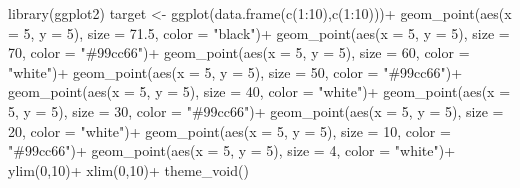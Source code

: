 \documentclass[
  letterpaper,
]{book}
\newenvironment{Shaded}{\begin{snugshade}}{\end{snugshade}}
\newcommand{\AttributeTok}[1]{\textcolor[rgb]{0.40,0.45,0.13}{#1}}
\newcommand{\DecValTok}[1]{\textcolor[rgb]{0.68,0.00,0.00}{#1}}
\newcommand{\FloatTok}[1]{\textcolor[rgb]{0.68,0.00,0.00}{#1}}
\newcommand{\FunctionTok}[1]{\textcolor[rgb]{0.28,0.35,0.67}{#1}}
\newcommand{\NormalTok}[1]{\textcolor[rgb]{0.00,0.23,0.31}{#1}}
\newcommand{\OtherTok}[1]{\textcolor[rgb]{0.00,0.23,0.31}{#1}}
\newcommand{\SpecialCharTok}[1]{\textcolor[rgb]{0.37,0.37,0.37}{#1}}
\newcommand{\StringTok}[1]{\textcolor[rgb]{0.13,0.47,0.30}{#1}}
\begin{document}
\begin{Shaded}
\begin{Highlighting}[]
\FunctionTok{library}\NormalTok{(ggplot2)}
\NormalTok{target }\OtherTok{\textless{}{-}} 
  \FunctionTok{ggplot}\NormalTok{(}\FunctionTok{data.frame}\NormalTok{(}\FunctionTok{c}\NormalTok{(}\DecValTok{1}\SpecialCharTok{:}\DecValTok{10}\NormalTok{),}\FunctionTok{c}\NormalTok{(}\DecValTok{1}\SpecialCharTok{:}\DecValTok{10}\NormalTok{)))}\SpecialCharTok{+}
  \FunctionTok{geom\_point}\NormalTok{(}\FunctionTok{aes}\NormalTok{(}\AttributeTok{x =} \DecValTok{5}\NormalTok{, }\AttributeTok{y =} \DecValTok{5}\NormalTok{), }\AttributeTok{size =} \FloatTok{71.5}\NormalTok{, }\AttributeTok{color =} \StringTok{"black"}\NormalTok{)}\SpecialCharTok{+}
  \FunctionTok{geom\_point}\NormalTok{(}\FunctionTok{aes}\NormalTok{(}\AttributeTok{x =} \DecValTok{5}\NormalTok{, }\AttributeTok{y =} \DecValTok{5}\NormalTok{), }\AttributeTok{size =} \DecValTok{70}\NormalTok{, }\AttributeTok{color =} \StringTok{"\#99cc66"}\NormalTok{)}\SpecialCharTok{+}
  \FunctionTok{geom\_point}\NormalTok{(}\FunctionTok{aes}\NormalTok{(}\AttributeTok{x =} \DecValTok{5}\NormalTok{, }\AttributeTok{y =} \DecValTok{5}\NormalTok{), }\AttributeTok{size =} \DecValTok{60}\NormalTok{, }\AttributeTok{color =} \StringTok{"white"}\NormalTok{)}\SpecialCharTok{+}
  \FunctionTok{geom\_point}\NormalTok{(}\FunctionTok{aes}\NormalTok{(}\AttributeTok{x =} \DecValTok{5}\NormalTok{, }\AttributeTok{y =} \DecValTok{5}\NormalTok{), }\AttributeTok{size =} \DecValTok{50}\NormalTok{, }\AttributeTok{color =} \StringTok{"\#99cc66"}\NormalTok{)}\SpecialCharTok{+}
  \FunctionTok{geom\_point}\NormalTok{(}\FunctionTok{aes}\NormalTok{(}\AttributeTok{x =} \DecValTok{5}\NormalTok{, }\AttributeTok{y =} \DecValTok{5}\NormalTok{), }\AttributeTok{size =} \DecValTok{40}\NormalTok{, }\AttributeTok{color =} \StringTok{"white"}\NormalTok{)}\SpecialCharTok{+}
  \FunctionTok{geom\_point}\NormalTok{(}\FunctionTok{aes}\NormalTok{(}\AttributeTok{x =} \DecValTok{5}\NormalTok{, }\AttributeTok{y =} \DecValTok{5}\NormalTok{), }\AttributeTok{size =} \DecValTok{30}\NormalTok{, }\AttributeTok{color =} \StringTok{"\#99cc66"}\NormalTok{)}\SpecialCharTok{+}
  \FunctionTok{geom\_point}\NormalTok{(}\FunctionTok{aes}\NormalTok{(}\AttributeTok{x =} \DecValTok{5}\NormalTok{, }\AttributeTok{y =} \DecValTok{5}\NormalTok{), }\AttributeTok{size =} \DecValTok{20}\NormalTok{, }\AttributeTok{color =} \StringTok{"white"}\NormalTok{)}\SpecialCharTok{+}
  \FunctionTok{geom\_point}\NormalTok{(}\FunctionTok{aes}\NormalTok{(}\AttributeTok{x =} \DecValTok{5}\NormalTok{, }\AttributeTok{y =} \DecValTok{5}\NormalTok{), }\AttributeTok{size =} \DecValTok{10}\NormalTok{, }\AttributeTok{color =} \StringTok{"\#99cc66"}\NormalTok{)}\SpecialCharTok{+}
  \FunctionTok{geom\_point}\NormalTok{(}\FunctionTok{aes}\NormalTok{(}\AttributeTok{x =} \DecValTok{5}\NormalTok{, }\AttributeTok{y =} \DecValTok{5}\NormalTok{), }\AttributeTok{size =} \DecValTok{4}\NormalTok{, }\AttributeTok{color =} \StringTok{"white"}\NormalTok{)}\SpecialCharTok{+}
  \FunctionTok{ylim}\NormalTok{(}\DecValTok{0}\NormalTok{,}\DecValTok{10}\NormalTok{)}\SpecialCharTok{+}
  \FunctionTok{xlim}\NormalTok{(}\DecValTok{0}\NormalTok{,}\DecValTok{10}\NormalTok{)}\SpecialCharTok{+}
  \FunctionTok{theme\_void}\NormalTok{()}


\end{Highlighting}
\end{Shaded}
\end{document}
